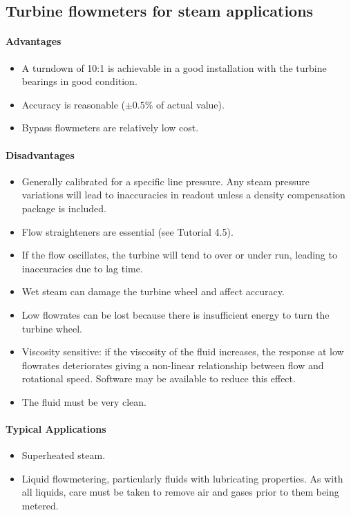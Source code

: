 \subsection{Turbine flowmeters for steam applications}
\paragraph{Advantages}
\begin{itemize}
	\item A turndown of 10:1 is achievable in a good installation with the turbine bearings in good condition.
	\item Accuracy is reasonable ($ \pm 0.5\% $ of actual value).
	\item Bypass flowmeters are relatively low cost.
\end{itemize}
\paragraph{Disadvantages}
\begin{itemize}
	\item Generally calibrated for a specific line pressure. Any steam pressure variations will lead to inaccuracies in readout unless a density compensation package is included.
	\item Flow straighteners are essential (see Tutorial 4.5).
	\item If the flow oscillates, the turbine will tend to over or under run, leading to inaccuracies due to lag time.
	\item Wet steam can damage the turbine wheel and affect accuracy.
	\item Low flowrates can be lost because there is insufficient energy to turn the turbine wheel.
	\item Viscosity sensitive: if the viscosity of the fluid increases, the response at low flowrates deteriorates giving a non-linear relationship between flow and rotational speed. Software may be available to reduce this effect.
	\item The fluid must be very clean.
\end{itemize}
\paragraph{Typical Applications}
\begin{itemize}
	\item Superheated steam.
	\item Liquid flowmetering, particularly fluids with lubricating properties. As with all liquids, care must be taken to remove air and gases prior to them being metered.
\end{itemize}

